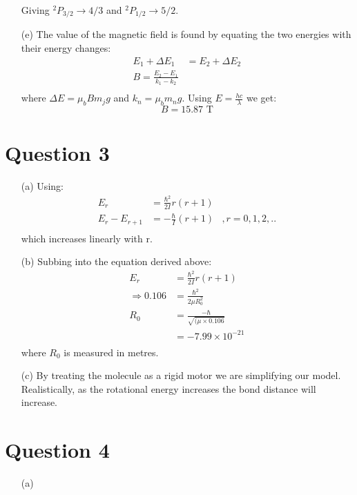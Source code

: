\documentclass[10pt,a4paper]{article}
\begin{document}
\begin{itemize}
	Giving $^{2}P_{3/2} \rightarrow 4/3$ and $^{2}P_{1/2} \rightarrow 5/2$.

	\item[(e)] The value of the magnetic field is found by equating the two energies with their energy changes:
		\begin{align*}
			E_{1} + \Delta E_{1} &= E_{2} + \Delta E_{2} \\
			B = \frac{E_{2} - E_{1}}{k_{1}-k_{2}} \\
		\end{align*}
	where $\Delta E = \mu_{b}B m_{j}g$ and $k_{n} = \mu_{b}m_{n}g$. Using $E = \frac{hc}{\lambda}$ we get:
		\begin{equation*}
			B = 15.87 \mbox{ T}
		\end{equation*}
\end{itemize}

\section*{Question 3}
\begin{itemize}
	\item[(a)] Using:
		\begin{align*}
			E_{r} &= \frac{\hbar^{2}}{2I}r(r+1) &\\
			E_{r} - E_{r+1} &= -\frac{\hbar}{I}(r+1) &, r = 0,1,2,.. \\
		\end{align*}
		which increases linearly with r.
	
	\item[(b)] Subbing into the equation derived above:
		\begin{align*}
			E_{r} &= \frac{\hbar^{2}}{2I}r(r+1) \\
			\Rightarrow 0.106 &= \frac{\hbar^{2}}{2\mu R_{0}^{2}} \\
			R_{0} &= \frac{-\hbar}{\sqrt{(\mu \times 0.106}} \\
					  &= -7.99 \times 10^{-21} \\
		\end{align*}
	where $R_{0}$ is measured in metres.

	\item[(c)] By treating the molecule as a rigid motor we are simplifying our model. Realistically, as the rotational energy increases the bond distance will increase.
\end{itemize}
\section*{Question 4}
\begin{itemize}
	\item[(a)] 
\end{itemize}
\end{document}
